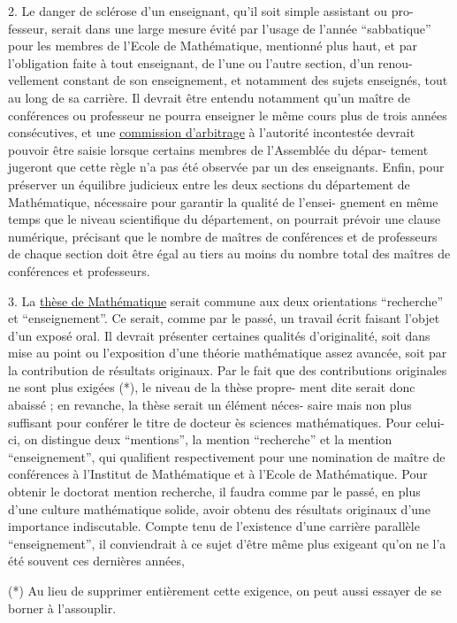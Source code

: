 
2. Le danger de sclérose d'un enseignant, qu'il soit simple assistant ou pro-%
fesseur, serait dans une large mesure évité par l'usage de l'année ``sabbatique''
pour les membres de l'Ecole de Mathématique, mentionné plus haut, et par
l'obligation faite à tout enseignant, de l'une ou l'autre section, d'un renou-%
vellement constant de son enseignement, et notamment des sujets enseignés,
tout au long de sa carrière. Il devrait être entendu notamment qu'un maître
de conférences ou professeur ne pourra enseigner le même cours plus de trois
années consécutives, et une \uline{commission d'arbitrage} à l'autorité incontestée
devrait pouvoir être saisie lorsque certains membres de l'Assemblée du dépar-%
tement jugeront que cette règle n'a pas été observée par un des enseignants.
Enfin, pour préserver un équilibre judicieux entre les deux sections du
département de Mathématique, nécessaire pour garantir la qualité de l'ensei-%
gnement en même temps que le niveau scientifique du département, on pourrait
prévoir une clause numérique, précisant que le nombre de maîtres de conférences
et de professeurs de chaque section doit être égal au tiers au moins du nombre
total des maîtres de conférences et professeurs.

3. La \uline{thèse de Mathématique} serait commune aux deux orientations ``recherche''
et ``enseignement''. Ce serait, comme par le passé, un travail écrit faisant
l'objet d'un exposé oral. Il devrait présenter certaines qualités d'originalité,
soit dans  mise au point ou l'exposition d'une théorie mathématique assez
avancée, soit par la contribution de résultats originaux. Par le fait que des
contributions originales ne sont plus exigées (*), le niveau de la thèse propre-%
ment dite serait donc abaissé ; en revanche, la thèse serait un élément néces-%
saire mais non plus suffisant pour conférer le titre de docteur ès sciences
mathématiques. Pour celui-ci, on distingue deux ``mentions'', la mention 
``recherche'' et la mention ``enseignement'', qui qualifient respectivement pour \margin{\unsure{$\lambda$}}
une nomination de maître de conférences à l'Institut de Mathématique et à
l'Ecole de Mathématique. Pour obtenir le doctorat mention recherche, il
faudra comme par le passé, en plus d'une culture mathématique solide, avoir
obtenu des résultats originaux d'une importance indiscutable. Compte tenu de
l'existence d'une carrière parallèle ``enseignement'', il conviendrait à ce
sujet d'être même plus exigeant qu'on ne l'a été souvent ces dernières années,

(*) Au lieu de supprimer entièrement cette exigence, on peut aussi essayer de
se borner à l'assouplir.

